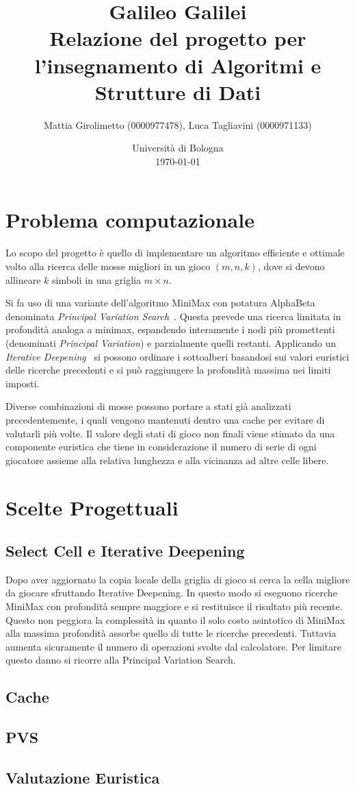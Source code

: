 \documentclass{article}
\title{Galileo Galilei \\
\large Relazione del progetto per l'insegnamento di Algoritmi e Strutture di Dati}
\author{
  Mattia Girolimetto (0000977478),
  Luca Tagliavini (0000971133)
}
\date{
	Universit\`a di Bologna \\
  \today
}
\begin{document}
\maketitle

\section{Problema computazionale}

Lo scopo del progetto \`e quello di implementare un algoritmo efficiente e ottimale
volto alla ricerca delle mosse migliori in un gioco $(m,n,k)$, dove si devono
allineare $k$ simboli in una griglia $m \times n$.

Si fa uso di una variante dell'algoritmo MiniMax con potatura
AlphaBeta denominata \emph{Principal Variation Search}~\cite{negascout}. Questa
prevede  una ricerca limitata in profondit\`a analoga a minimax, espandendo 
interamente i nodi pi\`u promettenti (denominati \emph{Principal Variation}) e
parzialmente quelli restanti. Applicando un \emph{Iterative Deepening}~\cite{id}
si possono ordinare i sottoalberi basandosi sui valori euristici delle ricerche
precedenti e si pu\`o raggiungere la profondit\`a massima nei limiti imposti.

Diverse combinazioni di mosse possono portare a stati gi\`a analizzati
precedentemente, i quali vengono mantenuti dentro una cache per evitare di
valutarli pi\`u volte. Il valore degli stati di gioco non finali viene stimato
da una componente euristica che tiene in considerazione il numero di serie di
ogni giocatore assieme alla relativa lunghezza e alla vicinanza ad altre celle
libere.

\section{Scelte Progettuali}

\subsection{Select Cell e Iterative Deepening}
Dopo aver aggiornato la copia locale della griglia di gioco si cerca la cella
migliore da giocare sfruttando Iterative Deepening. 
In questo modo si eseguono ricerche MiniMax con profondit\`a sempre maggiore
e si restituisce il risultato pi\`u recente. Questo non
peggiora la complessit\`a in quanto il solo costo asintotico di MiniMax alla
massima profondit\`a assorbe quello di tutte le ricerche precedenti.
Tuttavia aumenta sicuramente il numero di operazioni svolte dal calcolatore.
Per limitare questo danno si ricorre alla Principal Variation Search.

\subsection{Cache}
\subsection{PVS}
\subsection{Valutazione Euristica}

\pagebreak


\end{document}
